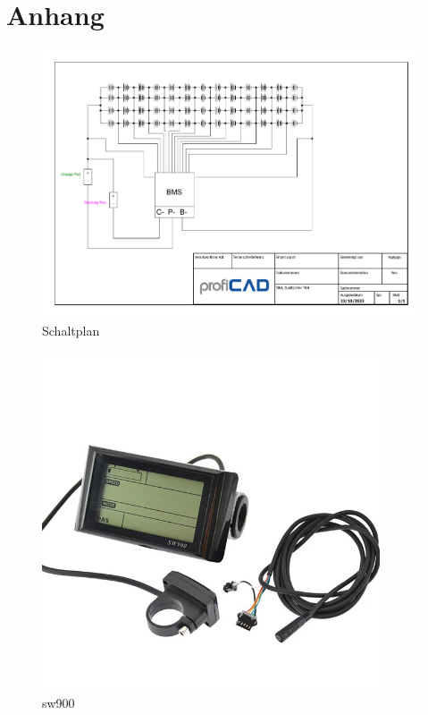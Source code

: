 

\chapter*{Anhang}
\begin{landscape}


\begin{figure}[h]
    \centering
    \includegraphics[width=22cm]{images/Schaltplan.pdf}
    \caption{Schaltplan\cite{lorenz_scherrer_selbst_2023}}%
    \label{fig:5_1}
\end{figure}
\end{landscape}

\begin{figure}[h]
    \centering
    \includegraphics[width=10cm]{images/sw900.jpeg}
    \caption{sw900\cite{lorenz_scherrer_selbst_2023}}%
    \label{fig:15}
\end{figure}
